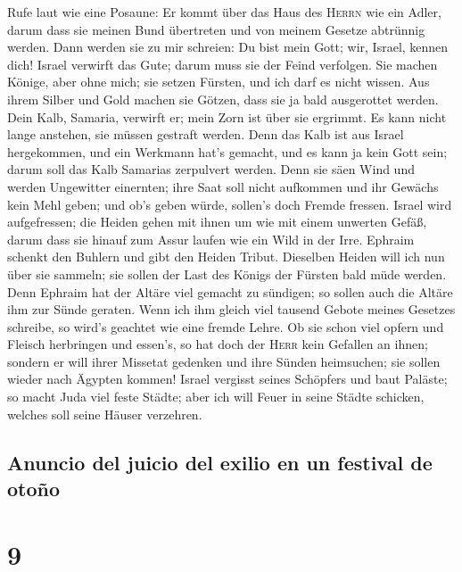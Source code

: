  Rufe laut wie eine Posaune: Er kommt über das Haus des
\textsc{Herrn} wie ein Adler, darum dass sie meinen Bund übertreten und
von meinem Gesetze abtrünnig werden.  Dann werden sie zu
mir schreien: Du bist mein Gott; wir, Israel, kennen dich!
 Israel verwirft das Gute; darum muss sie der Feind
verfolgen.  Sie machen Könige, aber ohne mich; sie setzen
Fürsten, und ich darf es nicht wissen. Aus ihrem Silber und Gold machen
sie Götzen, dass sie ja bald ausgerottet werden.  Dein
Kalb, Samaria, verwirft er; mein Zorn ist über sie ergrimmt. Es kann
nicht lange anstehen, sie müssen gestraft werden.  Denn
das Kalb ist aus Israel hergekommen, und ein Werkmann hat's gemacht, und
es kann ja kein Gott sein; darum soll das Kalb Samarias zerpulvert
werden.  Denn sie säen Wind und werden Ungewitter
einernten; ihre Saat soll nicht aufkommen und ihr Gewächs kein Mehl
geben; und ob's geben würde, sollen's doch Fremde fressen.
 Israel wird aufgefressen; die Heiden gehen mit ihnen um
wie mit einem unwerten Gefäß,  darum dass sie hinauf zum
Assur laufen wie ein Wild in der Irre. Ephraim schenkt den Buhlern und
gibt den Heiden Tribut.  Dieselben Heiden will ich nun
über sie sammeln; sie sollen der Last des Königs der Fürsten bald müde
werden.  Denn Ephraim hat der Altäre viel gemacht zu
sündigen; so sollen auch die Altäre ihm zur Sünde geraten.
 Wenn ich ihm gleich viel tausend Gebote meines Gesetzes
schreibe, so wird's geachtet wie eine fremde Lehre.  Ob
sie schon viel opfern und Fleisch herbringen und essen's, so hat doch
der \textsc{Herr} kein Gefallen an ihnen; sondern er will ihrer Missetat
gedenken und ihre Sünden heimsuchen; sie sollen wieder nach Ägypten
kommen!  Israel vergisst seines Schöpfers und baut
Paläste; so macht Juda viel feste Städte; aber ich will Feuer in seine
Städte schicken, welches soll seine Häuser verzehren.

\hypertarget{anuncio-del-juicio-del-exilio-en-un-festival-de-otouxf1o}{%
\subsection{Anuncio del juicio del exilio en un festival de
otoño}\label{anuncio-del-juicio-del-exilio-en-un-festival-de-otouxf1o}}

\hypertarget{section-8}{%
\section{9}\label{section-8}}

